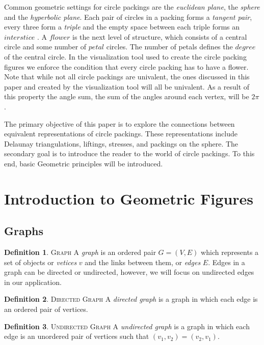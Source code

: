 \documentclass[11pt]{article}
\theoremstyle{definition}
\newtheorem{definition}{Definition}[section]
\begin{document}
	Common geometric settings for circle packings are the \emph{euclidean plane}, the \emph{sphere} and the \emph{hyperbolic plane}. 
	Each pair of circles in a packing forms a \emph{tangent pair}, every three form a \emph{triple} and the empty space between each triple forms an $interstice$ \cite{stephenson05introduction}. 
	A $flower$ is the next level of structure, which consists of a central circle and some number of $petal$ circles. 
	The number of petals defines the $degree$ of the central circle. 
	In the visualization tool used to create the circle packing figures we enforce the condition that every circle packing has to have a flower. 
	Note that while not all circle packings are univalent, the ones discussed in this paper and created by the visualization tool will all be univalent. 
	As a result of this property the angle sum, the sum of the angles around each vertex, will be $2\pi$.

	The primary objective of this paper is to explore the connections between equivalent representations of circle packings. 
	These representations include Delaunay triangulations, liftings, stresses, and packings on the sphere. 
	The secondary goal is to introduce the reader to the world of circle packings. To this end, basic Geometric principles will be introduced.

\section{Introduction to Geometric Figures}
\subsection{Graphs}
	\theoremstyle{definition}
	\begin{definition}{\textsc{Graph}}
		A \emph{graph} is an ordered pair $G=(V,E)$ which represents a set of objects or \emph{vetices} $v$ and the links between them, or \emph{edges} $E$. 
		Edges in a graph can be directed or undirected, however, we will focus on undirected edges in our application. 
	\end{definition}
	
	\theoremstyle{definition}
	\begin{definition}{\textsc{Directed Graph}}
  		A \emph{directed graph} is a graph in which each edge is an ordered pair of vertices.
	\end{definition}
	
	\theoremstyle{definition}
	\begin{definition}{\textsc{Undirected Graph}}
  		A \emph{undirected graph} is a graph in which each edge is an unordered pair of vertices such that $(v_1, v_2) = (v_2, v_1)$.
  	\end{definition}
	
\end{document}
